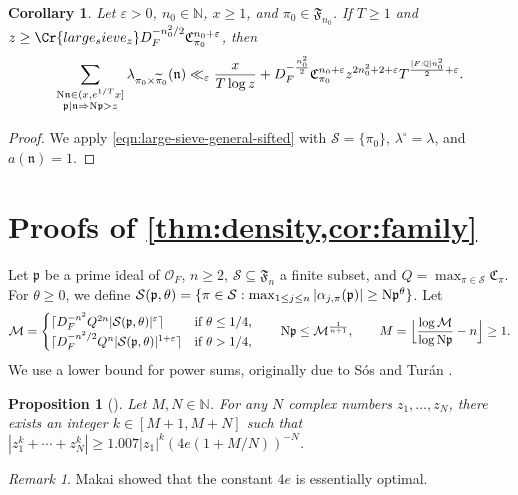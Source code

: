 \documentclass[11pt]{amsart}
\newtheorem{proposition}[theorem]{Proposition}
\newtheorem{corollary}[theorem]{Corollary}
\theoremstyle{remark}
\newtheorem*{remark}{Remark}
\numberwithin{equation}{section}
\newcommand{\p}{\mathfrak{p}}
\newcommand{\kp}{\mathfrak{p}}
\newcommand{\n}{\mathfrak{n}}
\newcommand{\N}{\textnormal{N}}
\newcommand{\Q}{\mathbb{Q}}
\newcommand{\mS}{\mathcal{S}}
\newcommand{\eps}{\varepsilon}
\renewcommand{\tilde}{\widetilde}
\renewcommand{\epsilon}{\varepsilon}
\begin{document}
\begin{corollary}
\label{cor:sifted-bound-single-rep}
Let $\eps > 0$, $n_0 \in \mathbb{N}$, $x\ge 1$, and $\pi_0\in\mathfrak{F}_{n_0}$.  If $T \ge 1$ and $z \geq \Cr{large_sieve_z} D_F^{-n_0^2/2}\mathfrak{C}_{\pi_0}^{n_0+\eps}$, then
\begin{equation}
\label{eqn:sifted-bound-single-rep}
    \sum_{\substack{\N \n \in (x, e^{1/T} x] \\ \p \mid \n \Rightarrow \N \p > z}}  \lambda_{\pi_0 \times \tilde{\pi}_0}(\n)
    \ll_{\epsilon}
    \frac{x}{T \log z} + D_F^{-\frac{n_0^2}{2}}\mathfrak{C}_{\pi_0}^{n_0+\eps} z^{2n_0^2+2+\eps} T^{\frac{[F:\Q]n_0^2}{2}+\epsilon}.
\end{equation}
\end{corollary}
\begin{proof}
We apply \eqref{eqn:large-sieve-general-sifted} with $\mS = \{\pi_0\}$, $\lambda^\circ = \lambda$, and $a(\n) = 1$.
\end{proof}


\section{Proofs of \cref{thm:density,cor:family}}
\label{sec:family_proofs}

Let $\kp$ be a prime ideal of $\mathcal{O}_F$, $n\geq 2$, $\mathcal{S}\subseteq \mathfrak{F}_n$ a finite subset, and $Q=\max_{\pi\in\mathcal{S}}\mathfrak{C}_{\pi}$.  For $\theta\geq 0$, we define $\mathcal{S}(\kp,\theta) = \{ \pi \in \mathcal{S} : \max_{1\leq j\leq n} |\alpha_{j,\pi}(\kp)| \ge \N \kp^\theta \}$.  Let
\begin{equation}
\label{eqn:family_defs}
\begin{gathered}
\mathcal{M}=\begin{cases}\lceil D_F^{-n^2}Q^{2n}|\mathcal{S}(\kp,\theta)|^{\epsilon}\rceil&\mbox{if $\theta\leq 1/4$,}\\
\lceil D_F^{-n^2/2}Q^{n}|\mathcal{S}(\kp,\theta)|^{1+\epsilon}\rceil&\mbox{if $\theta>1/4$,}
\end{cases}\qquad \N\kp\leq \mathcal{M}^{\frac{1}{n+1}},\qquad M = \Big\lfloor\frac{\log \mathcal{M}}{\log\N\kp}-n\Big\rfloor\geq 1.
\end{gathered}
\end{equation}
We use a lower bound for power sums, originally due to S{\'o}s and Tur{\'a}n \cite{SosTuran}.

\begin{proposition}[{\cite{KolesnikStraus}}]
\label{prop:Turan}
Let $M,N\in \mathbb{N}$.  For any $N$ complex numbers $z_1,\ldots,z_N$, there exists an integer $k\in[M+1,M+N]$ such that $|z_1^k+\cdots+z_N^k|\geq 1.007|z_1|^k (4e(1+M/N))^{-N}$. 
\end{proposition}
\begin{remark}
Makai \cite{Makai} showed that the constant $4e$ is essentially optimal.
\end{remark}
\end{document}
